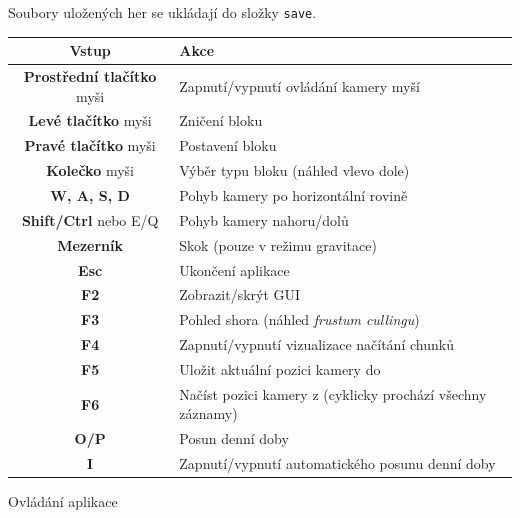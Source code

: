 Soubory uložených her se ukládají do složky \verb|save|.

\begin{tableFloat}[H]
	\begin{tabular}{c l}
		\textbf{Vstup} & \textbf{Akce} \\ \hline
		\textbf{Prostřední tlačítko} myši & Zapnutí/vypnutí ovládání kamery myší \\
		\textbf{Levé tlačítko} myši & Zničení bloku \\
		\textbf{Pravé tlačítko} myši & Postavení bloku \\
		\textbf{Kolečko} myši & Výběr typu bloku (náhled vlevo dole) \\
		\textbf{W, A, S, D} & Pohyb kamery po horizontální rovině \\
		\textbf{Shift/Ctrl} nebo E/Q & Pohyb kamery nahoru/dolů \\
		\textbf{Mezerník} & Skok (pouze v režimu gravitace) \\
		\textbf{Esc} & Ukončení aplikace \\
		\textbf{F2} & Zobrazit/skrýt GUI \\
		\textbf{F3} & Pohled shora (náhled \textit{frustum cullingu}) \\
		\textbf{F4} & Zapnutí/vypnutí vizualizace načítání chunků \\
		\textbf{F5} & Uložit aktuální pozici kamery do \inlineDCode{positions.txt} \\
		\textbf{F6} & Načíst pozici kamery z \inlineDCode{positions.txt} (cyklicky prochází všechny záznamy) \\
		\textbf{O/P} & Posun denní doby \\
		\textbf{I} & Zapnutí/vypnutí automatického posunu denní doby \\
	\end{tabular}
	\caption{Ovládání aplikace}
\end{tableFloat}

\vfill
{}

